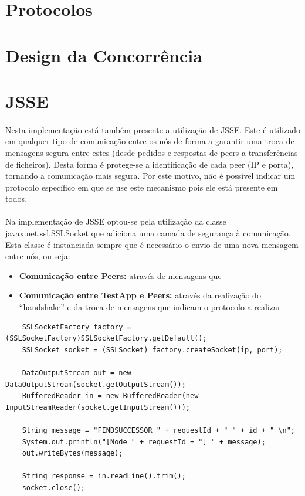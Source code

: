 \documentclass[11pt,oneside]{book}
\begin{document}
\section{Protocolos}

\section{Design da Concorrência}

\section{JSSE}
\paragraph{}
    Nesta implementação está também presente a utilização de JSSE. Este é utilizado em qualquer 
    tipo de comunicação entre os nós de forma a garantir uma troca de mensagens segura entre estes
    (desde pedidos e respostas de peers a transferências de ficheiros). Desta forma é protege-se 
    a identificação de cada peer (IP e porta), tornando a comunicação mais segura. Por este motivo, 
    não é possível indicar um protocolo específico em que se use este mecanismo pois ele está presente 
    em todos.

\paragraph{}
    Na implementação de JSSE optou-se pela utilização da classe javax.net.ssl.SSLSocket que adiciona
    uma camada de segurança à comunicação. Esta classe é instanciada sempre que é necessário o envio 
    de uma nova mensagem entre nós, ou seja:
    \begin{itemize}
        \item \textbf{Comunicação entre Peers:} através de mensagens que  
        \item \textbf{Comunicação entre TestApp e Peers:} através da realização do “handshake” e da 
        troca de mensagens que indicam o protocolo a realizar.
    \end{itemize}

\begin{lstlisting}
    SSLSocketFactory factory = (SSLSocketFactory)SSLSocketFactory.getDefault();
    SSLSocket socket = (SSLSocket) factory.createSocket(ip, port);

    DataOutputStream out = new DataOutputStream(socket.getOutputStream());
    BufferedReader in = new BufferedReader(new InputStreamReader(socket.getInputStream()));

    String message = "FINDSUCCESSOR " + requestId + " " + id + " \n";
    System.out.println("[Node " + requestId + "] " + message);
    out.writeBytes(message);

    String response = in.readLine().trim();
    socket.close();
\end{lstlisting}
\end{document}

